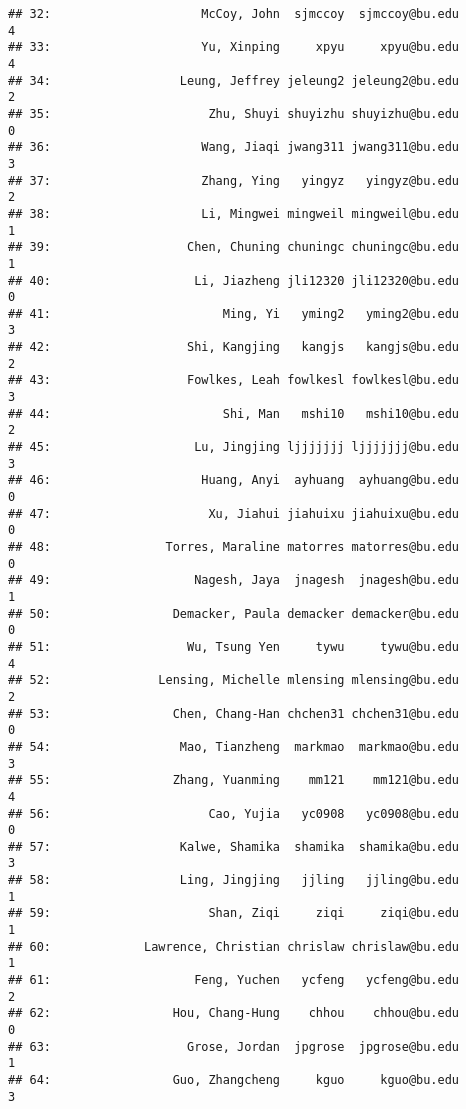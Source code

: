 \documentclass[
]{article}
\begin{document}
\begin{verbatim}
## 32:                     McCoy, John  sjmccoy  sjmccoy@bu.edu               4
## 33:                     Yu, Xinping     xpyu     xpyu@bu.edu               4
## 34:                  Leung, Jeffrey jeleung2 jeleung2@bu.edu               2
## 35:                      Zhu, Shuyi shuyizhu shuyizhu@bu.edu               0
## 36:                     Wang, Jiaqi jwang311 jwang311@bu.edu               3
## 37:                     Zhang, Ying   yingyz   yingyz@bu.edu               2
## 38:                     Li, Mingwei mingweil mingweil@bu.edu               1
## 39:                   Chen, Chuning chuningc chuningc@bu.edu               1
## 40:                    Li, Jiazheng jli12320 jli12320@bu.edu               0
## 41:                        Ming, Yi   yming2   yming2@bu.edu               3
## 42:                   Shi, Kangjing   kangjs   kangjs@bu.edu               2
## 43:                   Fowlkes, Leah fowlkesl fowlkesl@bu.edu               3
## 44:                        Shi, Man   mshi10   mshi10@bu.edu               2
## 45:                    Lu, Jingjing ljjjjjjj ljjjjjjj@bu.edu               3
## 46:                     Huang, Anyi  ayhuang  ayhuang@bu.edu               0
## 47:                      Xu, Jiahui jiahuixu jiahuixu@bu.edu               0
## 48:                Torres, Maraline matorres matorres@bu.edu               0
## 49:                    Nagesh, Jaya  jnagesh  jnagesh@bu.edu               1
## 50:                 Demacker, Paula demacker demacker@bu.edu               0
## 51:                   Wu, Tsung Yen     tywu     tywu@bu.edu               4
## 52:               Lensing, Michelle mlensing mlensing@bu.edu               2
## 53:                 Chen, Chang-Han chchen31 chchen31@bu.edu               0
## 54:                  Mao, Tianzheng  markmao  markmao@bu.edu               3
## 55:                 Zhang, Yuanming    mm121    mm121@bu.edu               4
## 56:                      Cao, Yujia   yc0908   yc0908@bu.edu               0
## 57:                  Kalwe, Shamika  shamika  shamika@bu.edu               3
## 58:                  Ling, Jingjing   jjling   jjling@bu.edu               1
## 59:                      Shan, Ziqi     ziqi     ziqi@bu.edu               1
## 60:             Lawrence, Christian chrislaw chrislaw@bu.edu               1
## 61:                    Feng, Yuchen   ycfeng   ycfeng@bu.edu               2
## 62:                 Hou, Chang-Hung    chhou    chhou@bu.edu               0
## 63:                   Grose, Jordan  jpgrose  jpgrose@bu.edu               1
## 64:                 Guo, Zhangcheng     kguo     kguo@bu.edu               3

\end{verbatim}
\end{document}
